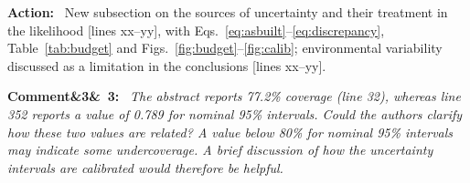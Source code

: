 \documentclass[11pt]{article}
\newenvironment{rcomment}[1]{\par\bigskip\noindent\textbf{Comment\ifx&#1&\else\ #1\fi:}\ \itshape}{\par}
\newenvironment{action}{\par\smallskip\noindent\color{resp}\textbf{Action:}\ }{\par}
\newcommand{\tbd}[1]{\textcolor{note}{\textsf{[#1]}}}
\newcommand{\lines}[1]{\tbd{lines #1}}
\begin{document}
\begin{action}
New subsection on the sources of uncertainty and their treatment in the likelihood \lines{xx--yy}, with
Eqs.~\eqref{eq:asbuilt}--\eqref{eq:discrepancy}, Table~\ref{tab:budget} and Figs.~\ref{fig:budget}--\ref{fig:calib};
environmental variability discussed as a limitation in the conclusions \lines{xx--yy}.
\end{action}

\begin{rcomment}{3}
The abstract reports 77.2\% coverage (line 32), whereas line 352 reports a value of 0.789 for nominal 95\% intervals.
Could the authors clarify how these two values are related? A value below 80\% for nominal 95\% intervals may indicate
some undercoverage. A brief discussion of how the uncertainty intervals are calibrated would therefore be helpful.
\end{rcomment}
\end{document}
